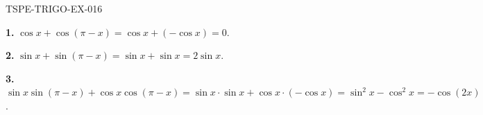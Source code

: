 \begin{corrige}{TSPE-TRIGO-EX-016}

\textbf{1.} $\cos x + \cos(\pi-x) = \cos x + (-\cos x) = 0$.

\textbf{2.} $\sin x + \sin(\pi-x) = \sin x + \sin x = 2\sin x$.

\textbf{3.} $\sin x \sin(\pi-x) + \cos x \cos(\pi-x) = \sin x \cdot \sin x + \cos x \cdot (-\cos x) = \sin^2 x - \cos^2 x = -\cos(2x)$.

\end{corrige}
